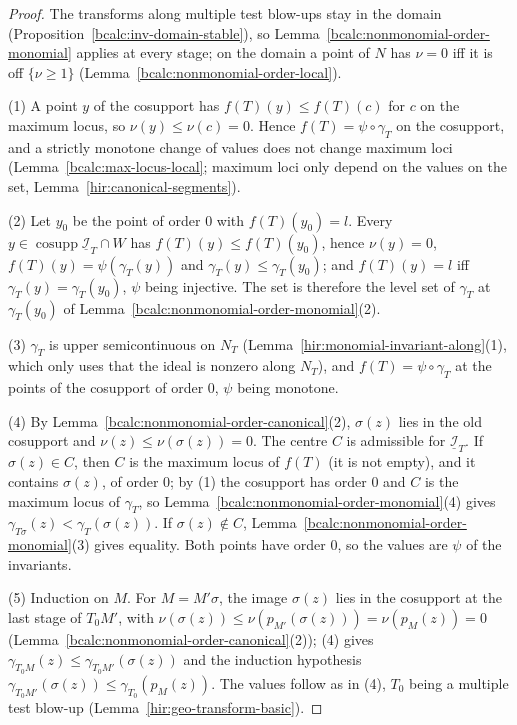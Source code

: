 \begin{proof}
\mixedleanok
The transforms along multiple test blow-ups stay in the domain (Proposition~\ref{bcalc:inv-domain-stable}), so Lemma~\ref{bcalc:nonmonomial-order-monomial} applies at every
stage; on the domain a point of \(N\) has \(\nu=0\) iff it is off \(\{\nu\ge1\}\) (Lemma~\ref{bcalc:nonmonomial-order-local}).

(1) A point \(y\) of the cosupport has \(f(T)(y)\le f(T)(c)\) for \(c\) on the maximum locus, so \(\nu(y)\le\nu(c)=0\). Hence \(f(T)=\psi\circ\gamma_T\) on the cosupport, and
a strictly monotone change of values does not change maximum loci (Lemma~\ref{bcalc:max-locus-local}; maximum loci only depend on the values on the set,
Lemma~\ref{hir:canonical-segments}).

(2) Let \(y_0\) be the point of order \(0\) with \(f(T)(y_0)=l\). Every \(y\in\operatorname{cosupp}\underline{\mathcal I}_T\cap W\) has \(f(T)(y)\le f(T)(y_0)\), hence \(\nu(y)=0\),
\(f(T)(y)=\psi(\gamma_T(y))\) and \(\gamma_T(y)\le\gamma_T(y_0)\); and \(f(T)(y)=l\) iff \(\gamma_T(y)=\gamma_T(y_0)\), \(\psi\) being injective. The set is therefore the level set
of \(\gamma_T\) at \(\gamma_T(y_0)\) of Lemma~\ref{bcalc:nonmonomial-order-monomial}(2).

(3) \(\gamma_T\) is upper semicontinuous on \(N_T\) (Lemma~\ref{hir:monomial-invariant-along}(1), which only uses that the ideal is nonzero along \(N_T\)), and
\(f(T)=\psi\circ\gamma_T\) at the points of the cosupport of order \(0\), \(\psi\) being monotone.

(4) By Lemma~\ref{bcalc:nonmonomial-order-canonical}(2), \(\sigma(z)\) lies in the old cosupport and \(\nu(z)\le\nu(\sigma(z))=0\). The centre \(C\) is admissible for
\(\underline{\mathcal I}_T\). If \(\sigma(z)\in C\), then \(C\) is the maximum locus of \(f(T)\) (it is not empty), and it contains \(\sigma(z)\), of order \(0\); by (1) the cosupport
has order \(0\) and \(C\) is the maximum locus of \(\gamma_T\), so Lemma~\ref{bcalc:nonmonomial-order-monomial}(4) gives \(\gamma_{T\sigma}(z)<\gamma_T(\sigma(z))\). If
\(\sigma(z)\notin C\), Lemma~\ref{bcalc:nonmonomial-order-monomial}(3) gives equality. Both points have order \(0\), so the values are \(\psi\) of the invariants.

(5) Induction on \(M\). For \(M=M'\sigma\), the image \(\sigma(z)\) lies in the cosupport at the last stage of \(T_0M'\), with
\(\nu(\sigma(z))\le\nu(p_{M'}(\sigma(z)))=\nu(p_M(z))=0\) (Lemma~\ref{bcalc:nonmonomial-order-canonical}(2)); (4) gives
\(\gamma_{T_0M}(z)\le\gamma_{T_0M'}(\sigma(z))\) and the induction hypothesis \(\gamma_{T_0M'}(\sigma(z))\le\gamma_{T_0}(p_M(z))\). The values follow as in (4), \(T_0\) being a
multiple test blow-up (Lemma~\ref{hir:geo-transform-basic}).
\end{proof}


